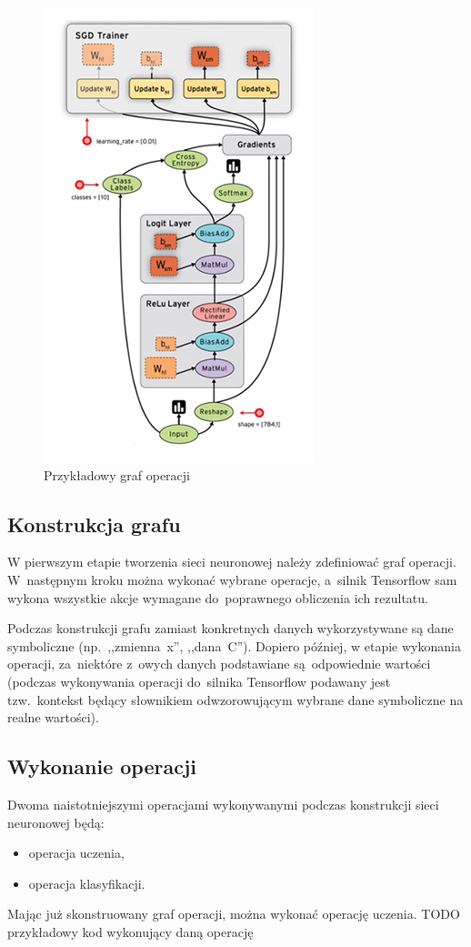 \begin{figure}[H]
	\centering
	\includegraphics[width=0.5\linewidth]{img/tf-sample-graph.jpg}
	\caption{Przykładowy graf operacji}
	\label{img:tf-smpl-grf}
\end{figure}

\subsection{Konstrukcja grafu}
W pierwszym etapie tworzenia sieci neuronowej należy zdefiniować graf operacji. W~następnym kroku można wykonać
wybrane operacje, a~silnik Tensorflow sam wykona wszystkie akcje wymagane do~poprawnego obliczenia ich rezultatu.

Podczas konstrukcji grafu zamiast konkretnych danych wykorzystywane są dane symboliczne (np.~,,zmienna~x'',
,,dana~C''). Dopiero później, w etapie wykonania operacji, za~niektóre z~owych danych podstawiane
są~odpowiednie wartości (podczas wykonywania operacji do~silnika Tensorflow podawany jest tzw.~kontekst będący
słownikiem odwzorowującym wybrane dane symboliczne na realne wartości).


\subsection{Wykonanie operacji}
Dwoma naistotniejszymi operacjami wykonywanymi podczas konstrukcji sieci neuronowej będą:
\begin{itemize}
    \item operacja uczenia,
    \item operacja klasyfikacji.
\end{itemize}

Mając już skonstruowany graf operacji, można wykonać operację uczenia.
TODO przykładowy kod wykonujący daną operację
